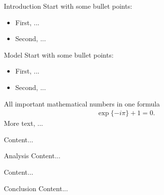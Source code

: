 	
\begin{frame}
	\thispagestyle{empty}
	\titlepage
\end{frame}


\begin{frame}{Introduction}
	Start with some bullet points:
	\begin{itemize}
		\item First, ...
		\item Second, ...
	\end{itemize}
\end{frame}

\begin{frame}{Model}
	Start with some bullet points:
	\begin{itemize}
		\item First, ...
		\item Second, ...
	\end{itemize}
	All important mathematical numbers in one formula
	\begin{eqnarray*}
		\exp\{-i\pi\} + 1 = 0.
	\end{eqnarray*}
	More text, ...
	\begin{definition}
		Content...
	\end{definition}
\end{frame}

\begin{frame}{Analysis}
	Content...
	\begin{theorem}
		Content...
	\end{theorem}
\end{frame}

\begin{frame}{Conclusion}
	Content...
\end{frame}
